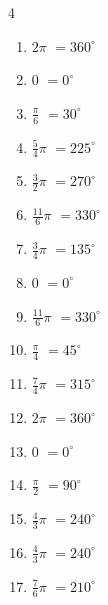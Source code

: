 \begin{multicols}{4}
\begin{enumerate}
  \item $\displaystyle 2\pi$
        $\displaystyle =360^{\circ}$

  \item $\displaystyle 0$
        $\displaystyle =0^{\circ}$

  \item $\displaystyle \frac{\pi}{6}$
        $\displaystyle =30^{\circ}$

  \item $\displaystyle \frac{5}{4}\pi$
        $\displaystyle =225^{\circ}$

  \item $\displaystyle \frac{3}{2}\pi$
        $\displaystyle =270^{\circ}$

  \item $\displaystyle \frac{11}{6}\pi$
        $\displaystyle =330^{\circ}$

\columnbreak %

  \item $\displaystyle \frac{3}{4}\pi$
        $\displaystyle =135^{\circ}$

  \item $\displaystyle 0$
        $\displaystyle =0^{\circ}$

  \item $\displaystyle \frac{11}{6}\pi$
        $\displaystyle =330^{\circ}$

  \item $\displaystyle \frac{\pi}{4}$
        $\displaystyle =45^{\circ}$

  \item $\displaystyle \frac{7}{4}\pi$
        $\displaystyle =315^{\circ}$

  \item $\displaystyle 2\pi$
        $\displaystyle =360^{\circ}$

  \item $\displaystyle 0$
        $\displaystyle =0^{\circ}$

  \item $\displaystyle \frac{\pi}{2}$
        $\displaystyle =90^{\circ}$

  \item $\displaystyle \frac{4}{3}\pi$
        $\displaystyle =240^{\circ}$

  \item $\displaystyle \frac{4}{3}\pi$
        $\displaystyle =240^{\circ}$

  \item $\displaystyle \frac{7}{6}\pi$
        $\displaystyle =210^{\circ}$


\end{enumerate}
\end{multicols}
